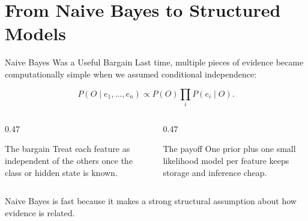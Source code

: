 \documentclass[aspectratio=169,10pt]{beamer}
\begin{document}

\makedecktitle

\section{From Naive Bayes to Structured Models}

\begin{frame}[shrink=10]{Naive Bayes Was a Useful Bargain}
  Last time, multiple pieces of evidence became computationally simple when we assumed conditional independence:

  \[
    P(O\mid e_1,\ldots,e_n)
    \propto
    P(O)\prod_i P(e_i\mid O).
  \]

  \begin{columns}[T,onlytextwidth]
    \begin{column}{0.47\textwidth}
      \begin{block}{The bargain}
        Treat each feature as independent of the others once the class or hidden state is known.
      \end{block}
    \end{column}
    \begin{column}{0.47\textwidth}
      \begin{block}{The payoff}
        One prior plus one small likelihood model per feature keeps storage and inference cheap.
      \end{block}
    \end{column}
  \end{columns}

  \begin{keyidea}
    Naive Bayes is fast because it makes a strong structural assumption about how evidence is related.
  \end{keyidea}
\end{frame}
\end{document}
